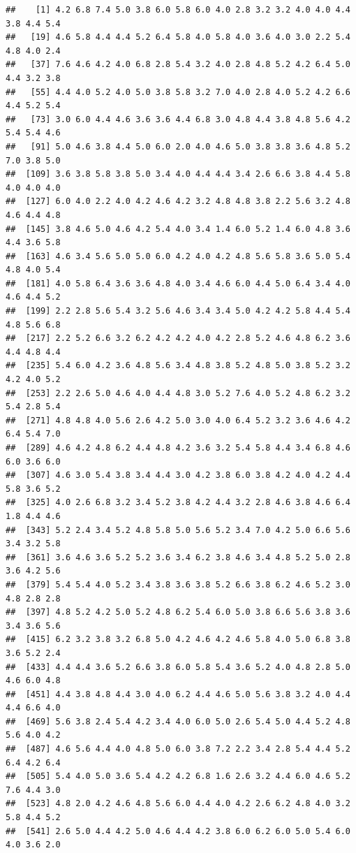 \begin{ExerciseList}
\begin{knitrout}
\begin{kframe}
\begin{alltt}
\end{alltt}
\begin{verbatim}
##    [1] 4.2 6.8 7.4 5.0 3.8 6.0 5.8 6.0 4.0 2.8 3.2 3.2 4.0 4.0 4.4 3.8 4.4 5.4
##   [19] 4.6 5.8 4.4 4.4 5.2 6.4 5.8 4.0 5.8 4.0 3.6 4.0 3.0 2.2 5.4 4.8 4.0 2.4
##   [37] 7.6 4.6 4.2 4.0 6.8 2.8 5.4 3.2 4.0 2.8 4.8 5.2 4.2 6.4 5.0 4.4 3.2 3.8
##   [55] 4.4 4.0 5.2 4.0 5.0 3.8 5.8 3.2 7.0 4.0 2.8 4.0 5.2 4.2 6.6 4.4 5.2 5.4
##   [73] 3.0 6.0 4.4 4.6 3.6 3.6 4.4 6.8 3.0 4.8 4.4 3.8 4.8 5.6 4.2 5.4 5.4 4.6
##   [91] 5.0 4.6 3.8 4.4 5.0 6.0 2.0 4.0 4.6 5.0 3.8 3.8 3.6 4.8 5.2 7.0 3.8 5.0
##  [109] 3.6 3.8 5.8 3.8 5.0 3.4 4.0 4.4 4.4 3.4 2.6 6.6 3.8 4.4 5.8 4.0 4.0 4.0
##  [127] 6.0 4.0 2.2 4.0 4.2 4.6 4.2 3.2 4.8 4.8 3.8 2.2 5.6 3.2 4.8 4.6 4.4 4.8
##  [145] 3.8 4.6 5.0 4.6 4.2 5.4 4.0 3.4 1.4 6.0 5.2 1.4 6.0 4.8 3.6 4.4 3.6 5.8
##  [163] 4.6 3.4 5.6 5.0 5.0 6.0 4.2 4.0 4.2 4.8 5.6 5.8 3.6 5.0 5.4 4.8 4.0 5.4
##  [181] 4.0 5.8 6.4 3.6 3.6 4.8 4.0 3.4 4.6 6.0 4.4 5.0 6.4 3.4 4.0 4.6 4.4 5.2
##  [199] 2.2 2.8 5.6 5.4 3.2 5.6 4.6 3.4 3.4 5.0 4.2 4.2 5.8 4.4 5.4 4.8 5.6 6.8
##  [217] 2.2 5.2 6.6 3.2 6.2 4.2 4.2 4.0 4.2 2.8 5.2 4.6 4.8 6.2 3.6 4.4 4.8 4.4
##  [235] 5.4 6.0 4.2 3.6 4.8 5.6 3.4 4.8 3.8 5.2 4.8 5.0 3.8 5.2 3.2 4.2 4.0 5.2
##  [253] 2.2 2.6 5.0 4.6 4.0 4.4 4.8 3.0 5.2 7.6 4.0 5.2 4.8 6.2 3.2 5.4 2.8 5.4
##  [271] 4.8 4.8 4.0 5.6 2.6 4.2 5.0 3.0 4.0 6.4 5.2 3.2 3.6 4.6 4.2 6.4 5.4 7.0
##  [289] 4.6 4.2 4.8 6.2 4.4 4.8 4.2 3.6 3.2 5.4 5.8 4.4 3.4 6.8 4.6 6.0 3.6 6.0
##  [307] 4.6 3.0 5.4 3.8 3.4 4.4 3.0 4.2 3.8 6.0 3.8 4.2 4.0 4.2 4.4 5.8 3.6 5.2
##  [325] 4.0 2.6 6.8 3.2 3.4 5.2 3.8 4.2 4.4 3.2 2.8 4.6 3.8 4.6 6.4 1.8 4.4 4.6
##  [343] 5.2 2.4 3.4 5.2 4.8 5.8 5.0 5.6 5.2 3.4 7.0 4.2 5.0 6.6 5.6 3.4 3.2 5.8
##  [361] 3.6 4.6 3.6 5.2 5.2 3.6 3.4 6.2 3.8 4.6 3.4 4.8 5.2 5.0 2.8 3.6 4.2 5.6
##  [379] 5.4 5.4 4.0 5.2 3.4 3.8 3.6 3.8 5.2 6.6 3.8 6.2 4.6 5.2 3.0 4.8 2.8 2.8
##  [397] 4.8 5.2 4.2 5.0 5.2 4.8 6.2 5.4 6.0 5.0 3.8 6.6 5.6 3.8 3.6 3.4 3.6 5.6
##  [415] 6.2 3.2 3.8 3.2 6.8 5.0 4.2 4.6 4.2 4.6 5.8 4.0 5.0 6.8 3.8 3.6 5.2 2.4
##  [433] 4.4 4.4 3.6 5.2 6.6 3.8 6.0 5.8 5.4 3.6 5.2 4.0 4.8 2.8 5.0 4.6 6.0 4.8
##  [451] 4.4 3.8 4.8 4.4 3.0 4.0 6.2 4.4 4.6 5.0 5.6 3.8 3.2 4.0 4.4 4.4 6.6 4.0
##  [469] 5.6 3.8 2.4 5.4 4.2 3.4 4.0 6.0 5.0 2.6 5.4 5.0 4.4 5.2 4.8 5.6 4.0 4.2
##  [487] 4.6 5.6 4.4 4.0 4.8 5.0 6.0 3.8 7.2 2.2 3.4 2.8 5.4 4.4 5.2 6.4 4.2 6.4
##  [505] 5.4 4.0 5.0 3.6 5.4 4.2 4.2 6.8 1.6 2.6 3.2 4.4 6.0 4.6 5.2 7.6 4.4 3.0
##  [523] 4.8 2.0 4.2 4.6 4.8 5.6 6.0 4.4 4.0 4.2 2.6 6.2 4.8 4.0 3.2 5.8 4.4 5.2
##  [541] 2.6 5.0 4.4 4.2 5.0 4.6 4.4 4.2 3.8 6.0 6.2 6.0 5.0 5.4 6.0 4.0 3.6 2.0

\end{verbatim}
\end{kframe}
\end{knitrout}
\end{ExerciseList}
